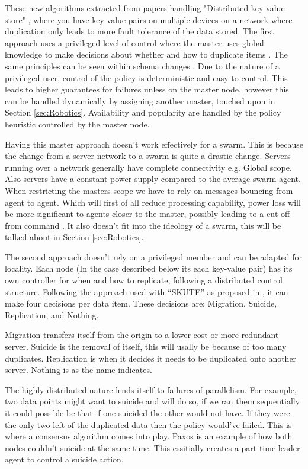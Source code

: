 \documentclass{UoYCSproject}
\begin{document}
These new algorithms extracted from papers handling "Distributed key-value store" \cite{Key-Value}, where you have key-value pairs on multiple devices on a network where duplication only leads to more fault tolerance of the data stored. 
The first approach uses a privileged level of control where the master uses global knowledge to make decisions about whether and how to duplicate items \cite{Avalability storage, Patent}.
The same principles can be seen within schema changes \cite{Scheme changes}.
Due to the nature of a privileged user, control of the policy is deterministic and easy to control.
This leads to higher guarantees for failures unless on the master node, however this can be handled dynamically by assigning another master, touched upon in Section \ref{sec:Robotics}.
Availability and popularity are handled by the policy heuristic controlled by the master node.

Having this master approach doesn’t work effectively for a swarm.
This is because the change from a server network to a swarm is quite a drastic change.
Servers running over a network generally have complete connectivity e.g. Global scope.
Also servers have a constant power supply compared to the average swarm agent.
When restricting the masters scope we have to rely on messages bouncing from agent to agent. 
Which will first of all reduce processing capability, power loss will be more significant to agents closer to the master, possibly leading to a cut off from command \cite{Swarm robotics reviewed}.
It also doesn’t fit into the ideology of a swarm, this will be talked about in Section \ref{sec:Robotics}.

The second approach doesn’t rely on a privileged member and can be adapted for locality.
Each node (In the case described below its each key-value pair) has its own controller for when and how to replicate, following a distributed control structure.
Following the approach used with “SKUTE” as proposed in \cite{Distributed Storage}, it can make four decisions per data item.
These decisions are; Migration, Suicide, Replication, and Nothing.

Migration transfers itself from the origin to a lower cost or more redundant server.
Suicide is the removal of itself, this will usally be because of too many duplicates.
Replication is when it decides it needs to be duplicated onto another server.
Nothing is as the name indicates.

The highly distributed nature lends itself to failures of parallelism. 
For example, two data points might want to suicide and will do so, if we ran them sequentially it could possible be that if one suicided the other would not have. 
If they were the only two left of the duplicated data then the policy would’ve failed.
This is where a consensus algorithm comes into play.
Paxos \cite{Paxos} is an example of how both nodes couldn’t suicide at the same time. 
This essitially creates a part-time leader agent to control a suicide action.
\end{document}
